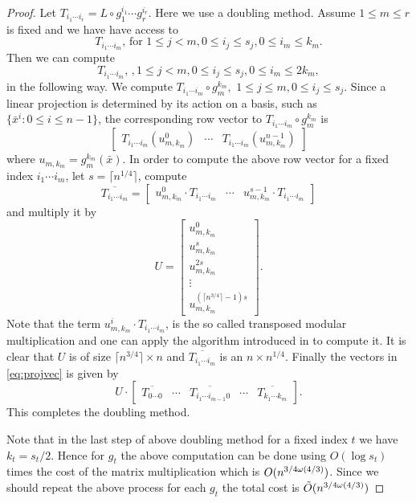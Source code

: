 \begin{proof}
Let $T_{i_1\cdots i_r} = L \circ g_1^{i_1}\cdots g_r^{i_r}$. Here we use a doubling method. Assume $1 \leq m \leq r$ is fixed and we have have access to 
$$T_{i_1\cdots i_m}, \, \mathrm{for}\,\, 1\leq j < m, 0 \leq i_j \leq s_j, 0 \leq i_m \leq k_m.$$
Then we can compute 
$$T_{i_1\cdots i_m}, \, , 1 \leq j < m, 0 \leq i_j \leq s_j, 0 \leq i_m \leq 2k_m,$$
in the following way. We compute 
$T_{i_1 \cdots i_m} \circ g_m^{k_m}, \,\, 1\leq j \leq m, 0 \leq i_j \leq s_j.$
 Since a linear projection is determined by its action on a basis, such as 
$\lbrace\bar{x}^i: 0\leq i \leq n-1 \rbrace$, the corresponding row vector to $T_{i_1 \cdots i_m} \circ g_m^{k_m}$ is 
\begin{equation}\label{eq:projvec}
\begin{bmatrix} T_{i_1 \cdots i_m}(u_{m,k_m}^0) & \cdots & T_{i_1 \cdots i_m}(u_{m,k_m}^{n-1}) \end{bmatrix}
\end{equation}
where $u_{m,k_m} = g_m^{k_m}(\bar{x})$. In order to compute the above row vector for a fixed index $i_1 \cdots i_m$, let $s = \lceil n^{1/4} \rceil$, compute
$$\overline{T_{i_1 \cdots i_m}} = \left[\begin{array}{c|c|c}
u_{m,k_m}^0\cdot T_{i_1 \cdots i_m} & \cdots & u_{m,k_m}^{s-1}\cdot T_{i_1 \cdots i_m}
\end{array} \right]$$
and multiply it by 
$$ U = \left[
\begin{array}{c}
u_{m,k_m}^0\\
\hline
u_{m,k_m}^{s}\\
\hline
u_{m,k_m}^{2s}\\
\hline
\vdots\\
\hline
u_{m,k_m}^{(\lceil n^{3/4} \rceil-1)s}
\end{array} \right].$$
Note that the term $u_{m,k_m}^i \cdot T_{i_1 \cdots i_m}$, is the so called transposed modular multiplication and one can apply the algorithm introduced in \cite{Shoup} to compute it. It is clear that $U$ is of size 
$\lceil n^{3/4} \rceil \times n$ and $\overline{T_{i_1 \cdots i_m}}$ is an $n \times n^{1/4}$. Finally the vectors in \eqref{eq:projvec}
is given by
$$
U \cdot \left[\begin{array}{c|c|c|c|c}
\overline{T_{0 \cdots 0}} & \cdots &\overline{T_{i_1 \cdots i_{m-1}0}} & \cdots & \overline{T_{k_1 \cdots k_m}}
\end{array}\right].
$$
This completes the doubling method.

Note that in the last step of above doubling method for a fixed index $t$ we have $k_t = s_t/2$. Hence for $g_t$ the above computation can be done 
using $O(\log s_t)$ times the cost of the matrix multiplication which is $O(n^{3/4 \omega(4/3)})$. Since we should repeat the above process for each $g_t$ the total cost is
$\tilde{O}(n^{3/4 \omega(4/3)})$ 
\end{proof}

